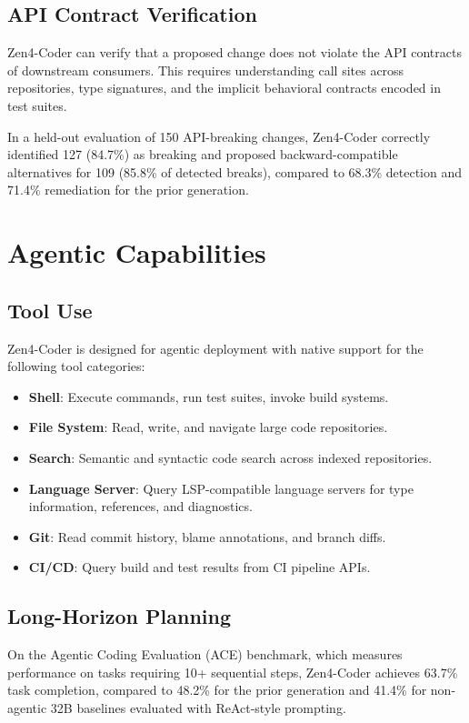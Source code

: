 \documentclass[11pt,a4paper]{article}
\begin{document}
\subsection{API Contract Verification}

Zen4-Coder can verify that a proposed change does not violate the API contracts of downstream consumers. This requires understanding call sites across repositories, type signatures, and the implicit behavioral contracts encoded in test suites.

In a held-out evaluation of 150 API-breaking changes, Zen4-Coder correctly identified 127 (84.7\%) as breaking and proposed backward-compatible alternatives for 109 (85.8\% of detected breaks), compared to 68.3\% detection and 71.4\% remediation for the prior generation.

\section{Agentic Capabilities}

\subsection{Tool Use}

Zen4-Coder is designed for agentic deployment with native support for the following tool categories:

\begin{itemize}
  \item \textbf{Shell}: Execute commands, run test suites, invoke build systems.
  \item \textbf{File System}: Read, write, and navigate large code repositories.
  \item \textbf{Search}: Semantic and syntactic code search across indexed repositories.
  \item \textbf{Language Server}: Query LSP-compatible language servers for type information, references, and diagnostics.
  \item \textbf{Git}: Read commit history, blame annotations, and branch diffs.
  \item \textbf{CI/CD}: Query build and test results from CI pipeline APIs.
\end{itemize}

\subsection{Long-Horizon Planning}

On the Agentic Coding Evaluation (ACE) benchmark, which measures performance on tasks requiring 10+ sequential steps, Zen4-Coder achieves 63.7\% task completion, compared to 48.2\% for the prior generation and 41.4\% for non-agentic 32B baselines evaluated with ReAct-style prompting.
\end{document}
